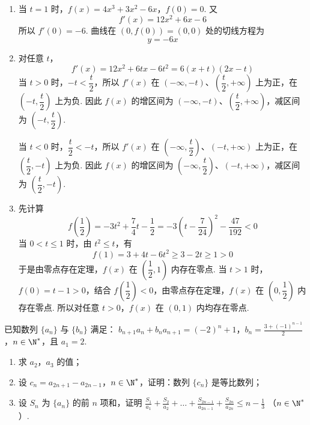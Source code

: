 \begin{solution}
\begin{enumerate}
\item 当 \(t=1\) 时，\(f(x)=4x^3+3x^2-6x\)，\(f(0)=0\).
又
\[
f'(x)=12x^2+6x-6
\]
所以 \(f'(0)=-6\). 曲线在 \((0,f(0))=(0,0)\) 处的切线方程为
\[
y=-6x
\]

\item 对任意 \(t\)，
\[
f'(x)=12x^2+6tx-6t^2
=6(x+t)(2x-t)
\]
当 \(t>0\) 时，\(-t<\dfrac t2\)，所以 \(f'(x)\) 在 \((-\infty,-t)\)、\(\left(\dfrac t2,+\infty\right)\) 上为正，在 \(\left(-t,\dfrac t2\right)\) 上为负. 因此 \(f(x)\) 的增区间为 \((-\infty,-t)\)、\(\left(\dfrac t2,+\infty\right)\)，减区间为 \(\left(-t,\dfrac t2\right)\).

当 \(t<0\) 时，\(\dfrac t2<-t\)，所以 \(f'(x)\) 在 \(\left(-\infty,\dfrac t2\right)\)、\((-t,+\infty)\) 上为正，在 \(\left(\dfrac t2,-t\right)\) 上为负. 因此 \(f(x)\) 的增区间为 \(\left(-\infty,\dfrac t2\right)\)、\((-t,+\infty)\)，减区间为 \(\left(\dfrac t2,-t\right)\).

\item 先计算
\[
f\left(\frac12\right)=-3t^2+\frac74t-\frac12
= -3\left(t-\frac{7}{24}\right)^2-\frac{47}{192}<0
\]
当 \(0<t\leqslant1\) 时，由 \(t^2\leqslant t\)，有
\[
f(1)=3+4t-6t^2\geqslant3-2t\geqslant1>0
\]
于是由零点存在定理，\(f(x)\) 在 \(\left(\dfrac12,1\right)\) 内存在零点. 当 \(t>1\) 时，\(f(0)=t-1>0\)，结合 \(f\left(\dfrac12\right)<0\)，由零点存在定理，\(f(x)\) 在 \(\left(0,\dfrac12\right)\) 内存在零点. 所以对任意 \(t>0\)，\(f(x)\) 在 \((0,1)\) 内均存在零点.
\end{enumerate}
\end{solution}

\begin{problem}
已知数列 \(\{a_{n}\}\) 与 \(\{b_{n}\}\) 满足： \(b_{n+1}a_{n} + b_{n}a_{n+1} = (-2)^{n} + 1\)，\(b_{n} = \frac{3 + (-1)^{n-1}}{2}\)，\(n \in \N^{*}\)，且 \(a_{1} = 2\).
\begin{enumerate}
\item 求 \(a_{2}\)，\(a_{3}\) 的值；
\item 设 \(c_{n} = a_{2n + 1} - a_{2n - 1}\)，\(n \in \N^{*}\)，证明：数列 \(\{c_{n}\}\) 是等比数列；
\item 设 \(S_{n}\) 为 \(\{a_{n}\}\) 的前 \(n\) 项和，证明 \(\frac{S_{1}}{a_{1}} + \frac{S_{2}}{a_{2}} + \ldots + \frac{S_{2n-1}}{a_{2n-1}} + \frac{S_{2n}}{a_{2n}} \leqslant n - \frac{1}{3}\) （\(n \in \N^{*}\)）.
\end{enumerate}
\end{problem}

